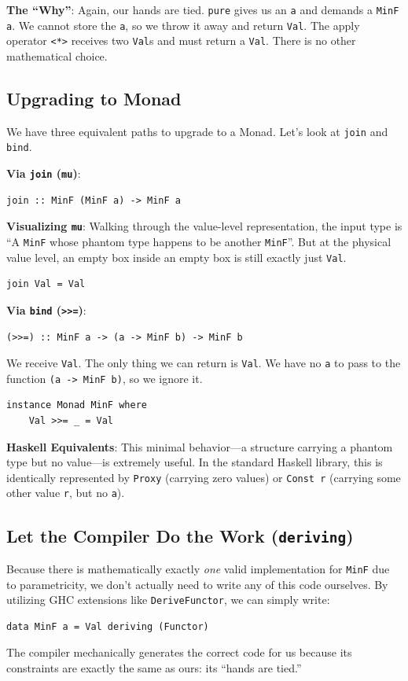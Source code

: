 \documentclass[12pt,a4paper]{article}
\begin{document}
\textbf{The ``Why''}: Again, our hands are tied. \texttt{pure} gives us an \texttt{a} and demands a \texttt{MinF a}. We cannot store the \texttt{a}, so we throw it away and return \texttt{Val}. The apply operator \texttt{<*>} receives two \texttt{Val}s and must return a \texttt{Val}. There is no other mathematical choice.

\subsection{Upgrading to Monad}

We have three equivalent paths to upgrade to a Monad. Let's look at \texttt{join} and \texttt{bind}.

\textbf{Via \texttt{join} (\texttt{mu})}:
\begin{lstlisting}
join :: MinF (MinF a) -> MinF a
\end{lstlisting}
\textbf{Visualizing \texttt{mu}}: Walking through the value-level representation, the input type is ``A \texttt{MinF} whose phantom type happens to be another \texttt{MinF}''. But at the physical value level, an empty box inside an empty box is still exactly just \texttt{Val}. 
\begin{lstlisting}
join Val = Val
\end{lstlisting}

\textbf{Via \texttt{bind} (\texttt{>>=})}:
\begin{lstlisting}
(>>=) :: MinF a -> (a -> MinF b) -> MinF b
\end{lstlisting}
We receive \texttt{Val}. The only thing we can return is \texttt{Val}. We have no \texttt{a} to pass to the function \texttt{(a -> MinF b)}, so we ignore it.
\begin{lstlisting}
instance Monad MinF where
    Val >>= _ = Val
\end{lstlisting}

\textbf{Haskell Equivalents}: This minimal behavior---a structure carrying a phantom type but no value---is extremely useful. In the standard Haskell library, this is identically represented by \texttt{Proxy} (carrying zero values) or \texttt{Const r} (carrying some other value \texttt{r}, but no \texttt{a}).

\subsection{Let the Compiler Do the Work (\texttt{deriving})}

Because there is mathematically exactly \textit{one} valid implementation for \texttt{MinF} due to parametricity, we don't actually need to write any of this code ourselves. By utilizing GHC extensions like \texttt{DeriveFunctor}, we can simply write:
\begin{lstlisting}
data MinF a = Val deriving (Functor)
\end{lstlisting}
The compiler mechanically generates the correct code for us because its constraints are exactly the same as ours: its ``hands are tied.''
\end{document}
